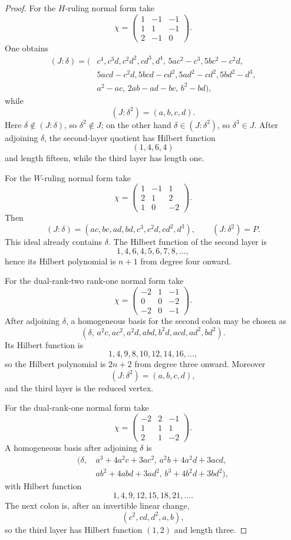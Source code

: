 \begin{proof}
For the \(H\)-ruling normal form take
\[
 \chi=
 \begin{pmatrix}
  1&-1&-1\\1&1&-1\\2&-1&0
 \end{pmatrix}.
\]
One obtains
\[
\begin{split}
 (J:\delta)=(&c^4,c^3d,c^2d^2,cd^3,d^4,\,
 5ac^2-c^3,5bc^2-c^2d,\\
 &5acd-c^2d,5bcd-cd^2,
 5ad^2-cd^2,5bd^2-d^3,\\
 &a^2-ac,\,2ab-ad-bc,\,b^2-bd),
\end{split}
\]
while
\[
 (J:\delta^2)=(a,b,c,d).
\]
Here \(\delta\notin(J:\delta)\), so \(\delta^2\notin J\);
on the other hand \(\delta\in(J:\delta^2)\), so
\(\delta^3\in J\).  After adjoining \(\delta\), the second-layer
quotient has Hilbert function
\[
 (1,4,6,4)
\]
and length fifteen, while the third layer has length one.

For the \(W\)-ruling normal form take
\[
 \chi=
 \begin{pmatrix}
  1&-1&1\\2&1&2\\1&0&-2
 \end{pmatrix}.
\]
Then
\[
 (J:\delta)=
 (ac,bc,ad,bd,c^3,c^2d,cd^2,d^3),
 \qquad
 (J:\delta^2)=P.
\]
This ideal already contains \(\delta\).  The Hilbert function of the
second layer is
\[
 1,4,6,4,5,6,7,8,\ldots,
\]
hence its Hilbert polynomial is \(n+1\) from degree four onward.

For the dual-rank-two rank-one normal form take
\[
 \chi=
 \begin{pmatrix}
 -2&1&-1\\0&0&-2\\-2&0&-1
 \end{pmatrix}.
\]
After adjoining \(\delta\), a homogeneous basis for the second colon
may be chosen as
\[
 (\delta,\,
 a^2c,ac^2,a^2d,abd,b^2d,acd,ad^2,bd^2).
\]
Its Hilbert function is
\[
 1,4,9,8,10,12,14,16,\ldots,
\]
so the Hilbert polynomial is \(2n+2\) from degree three onward.
Moreover
\[
 (J:\delta^2)=(a,b,c,d),
\]
and the third layer is the reduced vertex.

For the dual-rank-one normal form take
\[
 \chi=
 \begin{pmatrix}
 -2&2&-1\\1&1&1\\2&1&-2
 \end{pmatrix}.
\]
A homogeneous basis after adjoining \(\delta\) is
\[
\begin{split}
(\delta,\,
&a^3+4a^2c+3ac^2,\,
 a^2b+4a^2d+3acd,\\
&ab^2+4abd+3ad^2,\,
 b^3+4b^2d+3bd^2),
\end{split}
\]
with Hilbert function
\[
 1,4,9,12,15,18,21,\ldots.
\]
The next colon is, after an invertible linear change,
\[
 (c^2,cd,d^2,a,b),
\]
so the third layer has Hilbert function \((1,2)\) and length three.


\end{proof}
